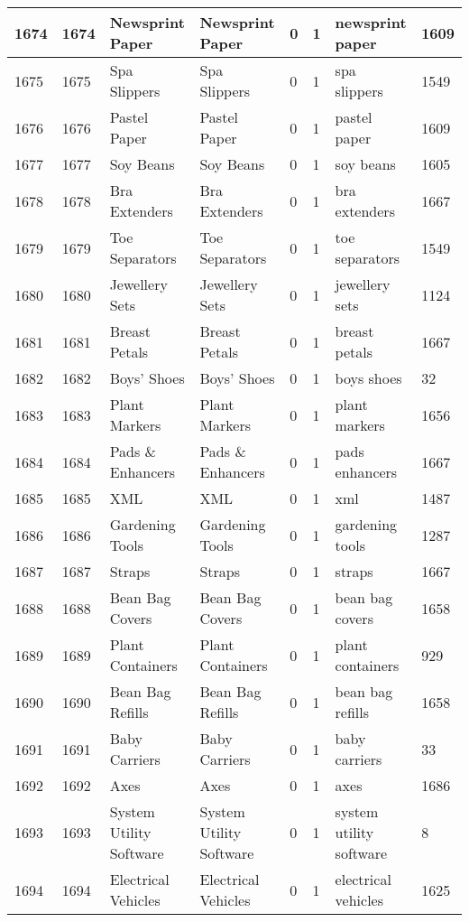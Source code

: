 \begin{longtable}{|l|l|l|l|l|l|l|l|}
1674 & 1674 & Newsprint Paper & Newsprint Paper & 0 & 1 & newsprint paper & 1609 \\ \hline 
1675 & 1675 & Spa Slippers & Spa Slippers & 0 & 1 & spa slippers & 1549 \\ \hline 
1676 & 1676 & Pastel Paper & Pastel Paper & 0 & 1 & pastel paper & 1609 \\ \hline 
1677 & 1677 & Soy Beans & Soy Beans & 0 & 1 & soy beans & 1605 \\ \hline 
1678 & 1678 & Bra Extenders & Bra Extenders & 0 & 1 & bra extenders & 1667 \\ \hline 
1679 & 1679 & Toe Separators & Toe Separators & 0 & 1 & toe separators & 1549 \\ \hline 
1680 & 1680 & Jewellery Sets & Jewellery Sets & 0 & 1 & jewellery sets & 1124 \\ \hline 
1681 & 1681 & Breast Petals & Breast Petals & 0 & 1 & breast petals & 1667 \\ \hline 
1682 & 1682 & Boys' Shoes & Boys' Shoes & 0 & 1 & boys shoes & 32 \\ \hline 
1683 & 1683 & Plant Markers & Plant Markers & 0 & 1 & plant markers & 1656 \\ \hline 
1684 & 1684 & Pads \& Enhancers & Pads \& Enhancers & 0 & 1 & pads enhancers & 1667 \\ \hline 
1685 & 1685 & XML & XML & 0 & 1 & xml & 1487 \\ \hline 
1686 & 1686 & Gardening Tools & Gardening Tools & 0 & 1 & gardening tools & 1287 \\ \hline 
1687 & 1687 & Straps & Straps & 0 & 1 & straps & 1667 \\ \hline 
1688 & 1688 & Bean Bag Covers & Bean Bag Covers & 0 & 1 & bean bag covers & 1658 \\ \hline 
1689 & 1689 & Plant Containers & Plant Containers & 0 & 1 & plant containers & 929 \\ \hline 
1690 & 1690 & Bean Bag Refills & Bean Bag Refills & 0 & 1 & bean bag refills & 1658 \\ \hline 
1691 & 1691 & Baby Carriers & Baby Carriers & 0 & 1 & baby carriers & 33 \\ \hline 
1692 & 1692 & Axes & Axes & 0 & 1 & axes & 1686 \\ \hline 
1693 & 1693 & System Utility Software & System Utility Software & 0 & 1 & system utility software & 8 \\ \hline 
1694 & 1694 & Electrical Vehicles & Electrical Vehicles & 0 & 1 & electrical vehicles & 1625 \\ \hline 

\end{longtable}
